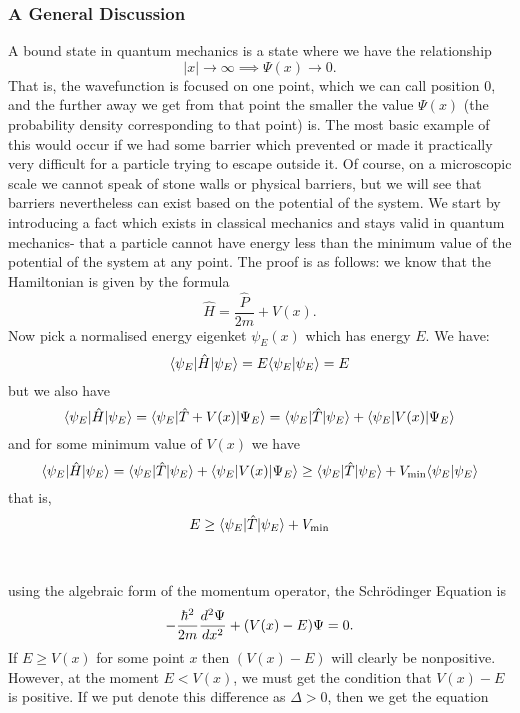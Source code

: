 \subsubsection{A General Discussion}
A bound state in quantum mechanics is a state where we have the relationship $$
|x|\to\infty\implies\Psi(x)\longrightarrow 0.
$$
That is, the wavefunction is focused on one point, which we can call position $0$, and the further away we get from that point the smaller the value $\Psi(x)$ (the probability density corresponding to that point) is. The most basic example of this would occur if we had some barrier which prevented or made it practically very difficult for a particle trying to escape outside it. Of course, on a microscopic scale we cannot speak of stone walls or physical barriers, but we will see that barriers nevertheless can exist based on the potential of the system. We start by introducing a fact which exists in classical mechanics and stays valid in quantum mechanics- that a particle cannot have energy less than the minimum value of the potential of the system at any point. The proof is as follows: we know that the Hamiltonian is given by the formula
$$
\hat{H}=\frac{\hat{P}}{2m}+V(x).
$$
Now pick a normalised energy eigenket $\psi_{E}(x)$ which has energy $E$. We have:
$$
\langle\psi_{E}|\hat{H}|\psi_{E}\rangle=E\langle\psi_{E}|\psi_{E}\rangle=E
$$
but we also have
$$
\langle\psi_{E}|\hat{H}|\psi_{E}\rangle=\langle\psi_{E}|{\hat{T}+V(x)}|\Psi_{E}\rangle=\langle\psi_{E}|\hat{{T}}|\psi_{E}\rangle+\langle\psi_{E}|V(x){|\Psi_{E}\rangle}
$$
and for some minimum value of $V(x)$ we have 
$$
\langle\psi_{E}|\hat{H}|\psi_{E}\rangle=\langle\psi_{E}|\hat{{T}}|\psi_{E}\rangle+\langle\psi_{E}|V(x){|\Psi_{E}\rangle}\geq\langle\psi_{E}|\hat{{T}}|\psi_{E}\rangle+V_{\min}\langle\psi_{E}|\psi_{E}\rangle
$$
that is,
$$
E\geq\langle\psi_{E}|\hat{T}|\psi_{E}\rangle+V_{\min}
$$
\\\\
using the algebraic form of the momentum operator, the Schr\"{o}dinger Equation is
$$
-\frac{\hbar^2}{2m}\frac{d^{2}\Psi}{dx^2}+(V(x)-E)\Psi=0.
$$
If $E\geq V(x)$ for some point $x$ then $(V(x)-E)$ will clearly be nonpositive. However, at the moment $E<V(x)$, we must get the condition that $V(x)-E$ is positive. If we put denote this difference as $\Delta>0$, then we get the equation

